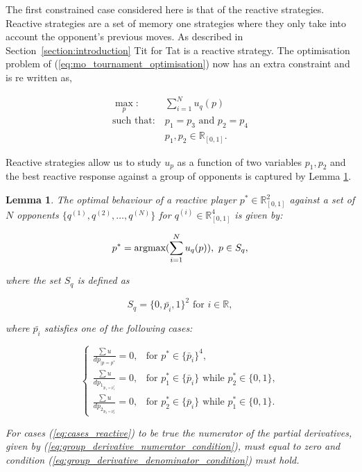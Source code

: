 \documentclass[10pt]{article}
\newcommand{\R}{\mathbb{R}}
\newtheorem{lemma}[theorem]{Lemma}
\begin{document}
The first constrained case considered here is that of the reactive strategies.
Reactive strategies are a set of memory one strategies where they only take into
account the opponent's previous moves. As described in Section~\ref{section:introduction}
Tit for Tat is a reactive strategy. The optimisation problem of (\ref{eq:mo_tournament_optimisation})
now has an extra constraint and is re written as,

\begin{equation}\label{eq:reactive_tournament_optimisation}
\begin{aligned}
\max_p: & \ \sum_{i=1} ^ N u_q(p)
\\
\text{such that}: & \ p_1 = p_3 \text{ and } p_2 = p_4\\
    & \ p_1, p_2 \in \R_{[0, 1]}.
\end{aligned}
\end{equation}

Reactive strategies allow us to study \(u_p\) as a function of two variables
\(p_1, p_2\) and the best reactive response against a group of opponents is captured by Lemma
\ref{lemma:reactive_group_best_response}.

\begin{lemma}\label{lemma:reactive_group_best_response}
    The optimal behaviour of a reactive player \(p^* \in \R_{[0, 1]} ^ 2\) against a set
    of \(N\) opponents \(\{q^{(1)}, q^{(2)}, \dots, q^{(N)} \}\) for \(q^{(i)} \in 
    \R_{[0, 1]} ^ 4\) is given by:

    \[p^* = \textnormal{argmax}(\sum\limits_{i=1} ^ N  u_q(p)), \ p \in S_q,\]
    
    where the set \(S_q\) is defined as 
    
    \[S_q = \{0, \bar{p_i}, 1 \} ^ 2 \text{ for } i \in \R,\]
    
    where \(\bar{p_i}\) satisfies one of the following cases:

    \begin{equation}\label{eq:cases_reactive}
        \left\{\begin{array}{lr}
        \frac{\sum u}{dp_{|p=p^*}} = 0, & \text{for } p^* \in \{\bar{p}_i\} ^ 4, \\
        \frac{\sum u}{dp_{1_{|p_1=p_1^*}}} = 0, & \text{for } p_1^* \in \{\bar{p}_i\}
        \text{ while } p_2 ^ * \in \{0, 1\},\\
        \frac{\sum u}{dp_{2_{|p_2=p_2^*}}} = 0, & \text{for } p_2^* \in \{\bar{p}_i\}
        \text{ while } p_1 ^ * \in \{0, 1\}.
        \end{array}\right.
    \end{equation}

    For cases (\ref{eq:cases_reactive}) to be true the numerator of the partial
    derivatives, given by (\ref{eq:group_derivative_numerator_condition}), must equal
    to zero and condition (\ref{eq:group_derivative_denominator_condition}) must hold.
\end{lemma}
\end{document}
